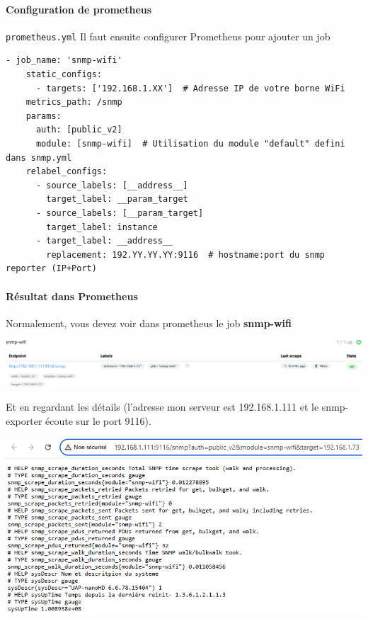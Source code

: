 \documentclass[french, 12pt]{article}%
\begin{document}
\paragraph{Configuration de prometheus } \verb?prometheus.yml?
Il faut ensuite configurer Prometheus pour ajouter un job 

\begin{lstlisting}[style=commande] 
- job_name: 'snmp-wifi'
    static_configs:
      - targets: ['192.168.1.XX']  # Adresse IP de votre borne WiFi
    metrics_path: /snmp
    params:
      auth: [public_v2]
      module: [snmp-wifi]  # Utilisation du module "default" defini dans snmp.yml
    relabel_configs:
      - source_labels: [__address__]
        target_label: __param_target
      - source_labels: [__param_target]
        target_label: instance
      - target_label: __address__
        replacement: 192.YY.YY.YY:9116  # hostname:port du snmp reporter (IP+Port)
\end{lstlisting} 


\paragraph{Résultat dans Prometheus}
 
Normalement, vous devez voir dans prometheus le job \textbf{snmp-wifi}

\begin{center}
\includegraphics[scale=0.5]{./ressource/snmpWifi}
\end{center}

Et en regardant les détails  (l'adresse mon serveur est 192.168.1.111 et le snmp-exporter écoute sur le port 9116).
\begin{center}
\includegraphics[scale=0.7]{./ressource/detailsSnmpWifi}
\end{center}
\end{document}
